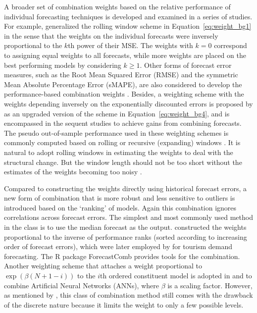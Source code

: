 \documentclass[11pt]{article}
\newcommand{\pkg}[1]{{\normalfont\fontseries{b}\selectfont #1}}
\begin{document}
A broader set of combination weights based on the relative performance of individual forecasting techniques is developed and examined in a series of studies. For example, \cite{Stock1998-np} generalized the rolling window scheme in Equation~\eqref{eq:weight_bg1} in the sense that the weights on the individual forecasts were inversely proportional to the $k$th power of their MSE. The weights with $k=0$ correspond to assigning equal weights to all forecasts, while more weights are placed on the best performing models by considering $k \geq 1$. Other forms of forecast error measures, such as the Root Mean Squared Error (RMSE) and the symmetric Mean Absolute Percentage Error (sMAPE), are also considered to develop the performance-based combination weights \citep[e.g.,][]{Nowotarski2014-ev,Pawlikowski2020-hm}. Besides, a weighting scheme with the weights depending inversely on the exponentially discounted errors is proposed by \cite{Stock2004-rq} as an upgraded version of the scheme in Equation~\eqref{eq:weight_bg4}, and is encompassed in the sequent studies \citep[e.g.,][]{Clark2010-jx,Genre2013-ut} to achieve gains from combining forecasts. The pseudo out-of-sample performance used in these weighting schemes is commonly computed based on rolling or recursive (expanding) windows \citep[e.g.,][]{Stock1998-np,Clark2010-jx,Genre2013-ut}. It is natural to adopt rolling windows in estimating the weights to deal with the structural change. But the window length should not be too short without the estimates of the weights becoming too noisy \citep{Baumeister2015-ft}.

Compared to constructing the weights directly using historical forecast errors, a new form of combination that is more robust and less sensitive to outliers is introduced based on the `ranking' of models. Again this combination ignores correlations across forecast errors. The simplest and most commonly used method in the class is to use the median forecast as the output. \cite{Aiolfi2006-rh} constructed the weights proportional to the inverse of performance ranks (sorted according to increasing order of forecast errors), which were later employed by \cite{Andrawis2011-kb} for tourism demand forecasting. The R package \pkg{ForecastComb} provides tools for the combination. Another weighting scheme that attaches a weight proportional to $\exp (\beta(N+1-i))$ to the $i$th ordered constituent model is adopted in \cite{Yao2008-or} and \cite{Donate2013-lq} to combine Artificial Neural Networks (ANNs), where $\beta$ is a scaling factor. However, as mentioned by \cite{Andrawis2011-kb}, this class of combination method still comes with the drawback of the discrete nature because it limits the weight to only a few possible levels.
\end{document}
